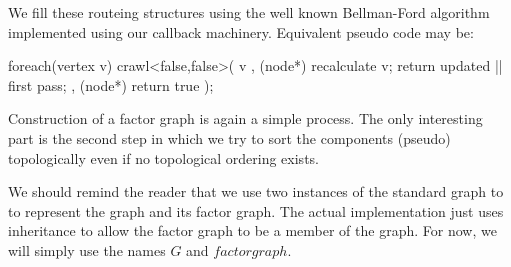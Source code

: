 We fill these routeing structures using the well known Bellman-Ford algorithm \cite{TODO} implemented using our callback machinery. Equivalent pseudo code may be:
\begin{code}
foreach(vertex v)
{
  crawl<false,false>( v
    , (node*){ recalculate v; return updated || first pass;}
    , (node*){ return true }
  ); 
}
\end{code}

Construction of a factor graph is again a simple process. The only interesting part is the second step in which we try to sort the components (pseudo) topologically even if no topological ordering exists.

We should remind the reader that we use two instances of the standard graph to to represent the graph and its factor graph. The actual implementation just uses inheritance to allow the factor graph to be a member of the graph. For now, we will simply use the names $G$ and $factorgraph$.

